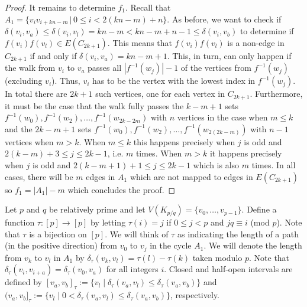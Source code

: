 \documentclass[11pt,a4paper]{article}
\begin{document}
\begin{proof}
It remains to determine $f_1$.
Recall that $A_1 = \{ v_i v_{i + kn-m} \,|\, 0 \leq i < 2(kn-m)+n \}$.
As before, we want to check if $\delta(v_i,v_a) \leq \delta(v_i,v_l) = kn-m < kn-m+n-1 \leq \delta(v_i,v_b)$ to determine if $f(v_i) f(v_l) \in E(C_{2k+1})$.
This means that $f(v_i) f(v_l)$ is a non-edge in $C_{2k+1}$ 
if and only if $\delta(v_i,v_a) = kn-m+1$.
This, in turn, can only happen if the walk from $v_i$ to $v_a$ passes all $|f^{-1}(w_j)|-1$ of the vertices from $f^{-1}(w_j)$ (excluding $v_i$).
Thus, $v_i$ has to be the vertex with the lowest index in $f^{-1}(w_j)$.
In total there are $2k+1$ such vertices, one for each vertex in $C_{2k+1}$.
Furthermore, it must be the case that the walk fully passes the $k-m+1$ sets
$f^{-1}(w_0), f^{-1}(w_2), \ldots, f^{-1}(w_{2k-2m})$
with $n$ vertices in the case when $m \leq k$ and the $2k-m+1$ sets
$f^{-1}(w_0), f^{-1}(w_2), \ldots, f^{-1}(w_{2(2k-m)})$
with $n-1$ vertices when $m > k$.
When $m \leq k$ this happens precisely when $j$ is odd and 
$2(k-m)+3 \leq j \leq 2k-1$, i.e. $m$ times.
When $m > k$ it happens precisely when $j$ is odd and 
$2(k-m+1)+1 \leq j \leq 2k-1$ which is also $m$ times.
In all cases, there will be $m$ edges in $A_1$ which are not mapped to edges in
$E(C_{2k+1})$ so $f_1 = |A_1|-m$ which concludes the proof.
\end{proof}

Let $p$ and $q$ be relatively prime and let $V(K_{p/q}) = \{v_0, \ldots, v_{p-1}\}$. Define a function $\tau : [p] \rightarrow [p]$ by letting $\tau(i) = j$ if $0 \leq j < p$ and $jq \equiv i $ (mod $p$). Note that $\tau$ is a bijection on $[p]$. We will think of $\tau$ as indicating the length of a path (in the positive direction) from $v_0$ to $v_j$ in the cycle $A_1$.
We will denote the length from $v_k$ to $v_l$ in $A_1$ by $\delta_{\tau}(v_k,v_l) = \tau(l)-\tau(k)$ taken modulo $p$. 
Note that $\delta_{\tau}(v_i,v_{i+a}) = \delta_{\tau}(v_0,v_a)$ for all integers $i$.
Closed and half-open intervals are defined by $[v_a,v_b]_{\tau} := \{v_l \;|\; \delta_{\tau}(v_a,v_l) \leq \delta_{\tau}(v_a,v_b)\}$ and $(v_a,v_b]_{\tau} := \{v_l \;|\; 0 < \delta_{\tau}(v_a,v_l) \leq \delta_{\tau}(v_a,v_b)\}$, respectively.
\end{document}
